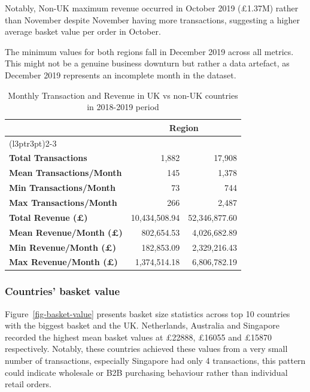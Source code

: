 \documentclass[
  letterpaper,
  DIV=11,
  numbers=noendperiod]{scrartcl}
\begin{document}
Notably, Non-UK maximum revenue occurred in October 2019 (£1.37M) rather
than November despite November having more transactions, suggesting a
higher average basket value per order in October.

The minimum values for both regions fall in December 2019 across all
metrics. This might not be a genuine business downturn but rather a data
artefact, as December 2019 represents an incomplete month in the
dataset.

\begingroup\fontsize{13}{15}\selectfont

\begin{longtable}[t]{>{}lrr}

\caption{\label{tbl-overview}Monthly Transaction and Revenue in UK vs
non-UK countries in 2018-2019 period}

\tabularnewline

\toprule
\multicolumn{1}{c}{ } & \multicolumn{2}{c}{Region} \\
\cmidrule(l{3pt}r{3pt}){2-3}
\cellcolor[HTML]{4C72B0}{\textcolor{white}{\textbf{Metric}}} & \cellcolor[HTML]{4C72B0}{\textcolor{white}{\textbf{Non-UK}}} & \cellcolor[HTML]{4C72B0}{\textcolor{white}{\textbf{UK}}}\\
\midrule
\textbf{Total Transactions} & 1,882 & 17,908\\
\textbf{Mean Transactions/Month} & 145 & 1,378\\
\textbf{Min Transactions/Month} & 73 & 744\\
\textbf{Max Transactions/Month} & 266 & 2,487\\
\textbf{Total Revenue (£)} & 10,434,508.94 & 52,346,877.60\\
\addlinespace
\textbf{Mean Revenue/Month (£)} & 802,654.53 & 4,026,682.89\\
\textbf{Min Revenue/Month (£)} & 182,853.09 & 2,329,216.43\\
\textbf{Max Revenue/Month (£)} & 1,374,514.18 & 6,806,782.19\\
\bottomrule

\end{longtable}

\endgroup{}

\subsubsection{Countries' basket value}\label{sec-basket-values}

Figure~\ref{fig-basket-value} presents basket size statistics across top
10 countries with the biggest basket and the UK. Netherlands, Australia
and Singapore recorded the highest mean basket values at £22888, £16055
and £15870 respectively. Notably, these countries achieved these values
from a very small number of transactions, especially Singapore had only
4 transactions, this pattern could indicate wholesale or B2B purchasing
behaviour rather than individual retail orders.
\end{document}
